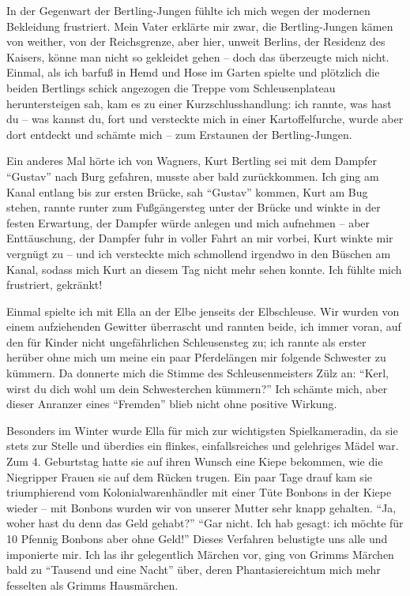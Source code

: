 \documentclass[a5paper,pagesize,10pt,twoside=true]{scrbook}
\begin{document}
In der Gegenwart der Bertling-Jungen fühlte ich mich wegen der modernen Bekleidung frustriert. Mein Vater erklärte mir zwar, die Bertling-Jungen kämen von weither, von der Reichsgrenze, aber hier, unweit Berlins, der Residenz des Kaisers, könne man nicht so gekleidet gehen -- doch das überzeugte mich nicht. Einmal, als ich barfuß in Hemd und Hose im Garten spielte und plötzlich die beiden Bertlings schick angezogen die Treppe vom Schleusenplateau heruntersteigen sah, kam es zu einer Kurzschlusshandlung: ich rannte, was hast du -- was kannst du, fort und versteckte mich in einer Kartoffelfurche, wurde aber dort entdeckt und schämte mich -- zum Erstaunen der Bertling-Jungen.

Ein anderes Mal hörte ich von Wagners, Kurt Bertling sei mit dem Dampfer \enquote{Gustav} nach Burg gefahren, musste aber bald zurückkommen. Ich ging am Kanal entlang bis zur ersten Brücke, sah \enquote{Gustav} kommen, Kurt am Bug stehen, rannte runter zum Fußgängersteg unter der Brücke und winkte in der festen Erwartung, der Dampfer würde anlegen und mich aufnehmen -- aber Enttäuschung, der Dampfer fuhr in voller Fahrt an mir vorbei, Kurt winkte mir vergnügt zu -- und ich versteckte mich schmollend irgendwo in den Büschen am Kanal, sodass mich Kurt an diesem Tag nicht mehr sehen konnte. Ich fühlte mich frustriert, gekränkt!

Einmal spielte ich mit Ella an der Elbe jenseits der Elbschleuse. Wir wurden von einem aufziehenden Gewitter überrascht und rannten beide, ich immer voran, auf den für Kinder nicht ungefährlichen Schleusensteg zu; ich rannte als erster herüber ohne mich um meine ein paar Pferdelängen mir folgende Schwester zu kümmern. Da donnerte mich die Stimme des Schleusenmeisters Zülz an: \enquote{Kerl, wirst du dich wohl um dein Schwesterchen kümmern?} Ich schämte mich, aber dieser Anranzer eines \enquote{Fremden} blieb nicht ohne positive Wirkung.

Besonders im Winter wurde Ella für mich zur wichtigsten Spielkameradin, da sie stets zur Stelle und überdies ein flinkes, einfallsreiches und gelehriges Mädel war. Zum 4. Geburtstag hatte sie auf ihren Wunsch eine Kiepe bekommen, wie die Niegripper Frauen sie auf dem Rücken trugen. Ein paar Tage drauf kam sie triumphierend vom Kolonialwarenhändler mit einer Tüte Bonbons in der Kiepe wieder -- mit Bonbons wurden wir von unserer Mutter sehr knapp gehalten. \enquote{Ja, woher hast du denn das Geld gehabt?} \enquote{Gar nicht. Ich hab gesagt: ich möchte für 10 Pfennig Bonbons aber ohne Geld!} Dieses Verfahren belustigte uns alle und imponierte mir. Ich las ihr gelegentlich Märchen vor, ging von Grimms Märchen bald zu \enquote{Tausend und eine Nacht} über, deren Phantasiereichtum mich mehr fesselten als Grimms Hausmärchen.
\end{document}
